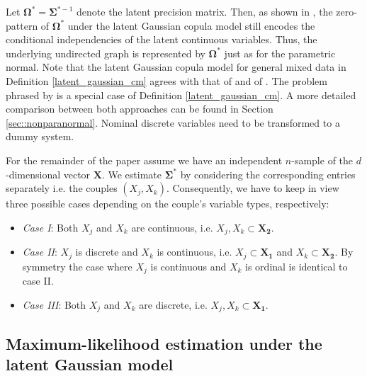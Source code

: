 Let $\boldsymbol{\Omega}^* = \boldsymbol{\Sigma}^{*-1}$ denote the latent precision matrix. Then, as shown in \citet{Liu09}, the zero-pattern of $\boldsymbol{\Omega}^*$ under the latent Gaussian copula model still encodes the conditional independencies of the latent continuous variables. Thus, the underlying undirected graph is represented by $\boldsymbol{\Omega}^*$ just as for the parametric normal. Note that the latent Gaussian copula model for general mixed data in Definition \ref{latent_gaussian_cm} agrees with that of \citet{Quan18} and of \citet{Feng19}. The problem phrased by \citet{Fan17} is a special case of  Definition \ref{latent_gaussian_cm}. A more detailed comparison between both approaches can be found in Section \ref{sec::nonparanormal}. Nominal discrete variables need to be transformed to a dummy system. 

For the remainder of the paper assume we have an independent $n$-sample of the $d$-dimensional vector $\boldsymbol{X}$. We estimate $\boldsymbol{\Sigma}^*$ by considering the corresponding entries separately i.e. the couples $(X_j,X_k)$. Consequently, we have to keep in view three possible cases depending on the couple's variable types, respectively:

\begin{itemize}
    
\item \textit{Case I}: Both $X_j$ and $X_k$ are continuous, i.e. $X_j, X_k \subset	\boldsymbol{X_2}$.

\item \textit{Case II}: $X_j$ is discrete and $X_k$ is continuous, i.e. $X_j \subset	\boldsymbol{X_1}$ and $X_k \subset \boldsymbol{X_2}$. By symmetry the case where $X_j$ is continuous and $X_k$ is ordinal is identical to case II. 

\item \textit{Case III}: Both $X_j$ and $X_k$ are discrete, i.e. $X_j, X_k \subset	\boldsymbol{X_1}$.
\end{itemize}

\subsection{Maximum-likelihood estimation under the latent Gaussian model}\label{sec::latent_gaussian} 

